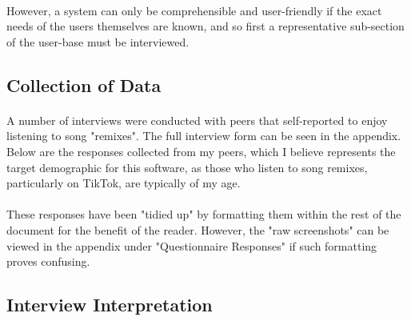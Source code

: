 \paragraph{}
However, a system can only be comprehensible and user-friendly if the exact needs of the users themselves are known, and so first a representative sub-section of the user-base must be interviewed.

\pagebreak
\subsection{Collection of Data}
\paragraph{}
A number of interviews were conducted with peers that self-reported to enjoy listening to song "remixes". The full interview form can be seen in the appendix. Below are the responses collected from my peers, which I believe represents the target demographic for this software, as those who listen to song remixes, particularly on TikTok, are typically of my age.

\paragraph{}
These responses have been "tidied up" by formatting them within the rest of the document for the benefit of the reader. However, the "raw screenshots" can be viewed in the appendix under "Questionnaire Responses" if such formatting proves confusing.



\pagebreak
\subsection{Interview Interpretation}

